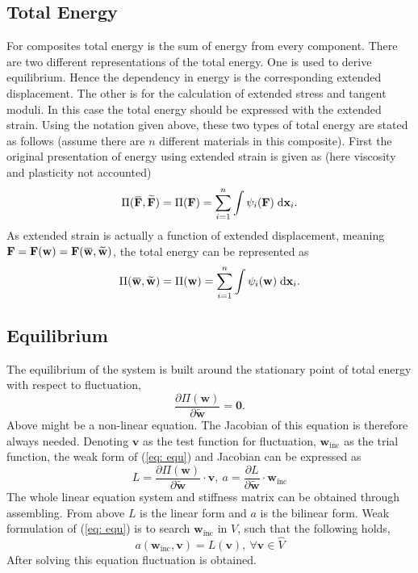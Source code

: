 \documentclass[10pt,a4paper]{scrreprt}
\newcommand{\myd}{\;\mathrm{d}}
\newcommand{\overbar}[1]{\mkern 1.5mu\overline{\mkern-1.5mu#1\mkern-1.5mu}\mkern 1.5mu}
\begin{document}
\subsection{Total Energy}
For composites total energy is the sum of energy from every component. There are two different representations of the total energy. One is used to derive equilibrium. Hence the dependency in energy is the corresponding extended displacement. The other is for the calculation of extended stress and tangent moduli. In this case the total energy should be expressed with the extended strain. Using the notation given above, these two types of total energy are stated as follows (assume there are $n$ different materials in this composite). First the original presentation of energy using extended strain is given as (here viscosity and plasticity not accounted) 
\begin{equation}
\label{eq: strain energy}
\Pi(\overbar{\mathbf{F}}, \widetilde{\mathbf{F}}) = \Pi(\mathbf{F}) = \sum^{n}_{i=1} \int \psi_{i}(\mathbf{F}) \myd{\mathbf{x}_{i}}.
\end{equation}
As extended strain is actually a function of extended displacement, meaning $\mathbf{F}=\mathbf{F}(\mathbf{w})=\mathbf{F}(\overbar{\mathbf{w}}, \widetilde{\mathbf{w}})$, the total energy can be represented as
\begin{equation}
\label{eq: disp energy}
\Pi(\overbar{\mathbf{w}}, \widetilde{\mathbf{w}}) = \Pi(\mathbf{w}) = \sum^{n}_{i=1} \int \psi_{i}(\mathbf{w}) \myd{\mathbf{x}_{i}}.
\end{equation} 

\subsection{Equilibrium}
The equilibrium of the system is built around the stationary point of total energy with respect to fluctuation,
\begin{equation}
\label{eq: equ}
\dfrac{\partial \Pi(\mathbf{w})}{\partial \widetilde{\mathbf{w}}} = \mathbf{0}.
\end{equation}
Above might be a non-linear equation. The Jacobian of this equation is therefore always needed. Denoting $\mathbf{v}$ as the test function for fluctuation, $\mathbf{w}_{\text{inc}}$ as the trial function, the weak form of (\ref{eq: equ}) and Jacobian can be expressed as
\begin{equation}
\label{eq: bi and li}
L = \dfrac{\partial \Pi(\mathbf{w})}{\partial \widetilde{\mathbf{w}}} \cdot \mathbf{v}, \ a = \dfrac{\partial L}{\partial \widetilde{\mathbf{w}}} \cdot \mathbf{w}_{\text{inc}}
\end{equation}
The whole linear equation system and stiffness matrix can be obtained through assembling. From above $L$ is the linear form and $a$ is the bilinear form. Weak formulation of (\ref{eq: equ}) is to search $\mathbf{w}_{\text{inc}}$ in $V$, such that the following holds,
\begin{equation}
a(\mathbf{w}_{\text{inc}}, \mathbf{v}) = L(\mathbf{v}),\ \forall \mathbf{v} \in \hat{V}
\end{equation}
After solving this equation fluctuation is obtained.
\end{document}
